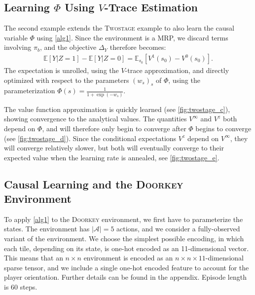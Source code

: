 \documentclass[letterpaper]{article} %
\newcommand{\EE}{\mathbb{E}}
\newcommand{\doorkey}{\textsc{Doorkey}\xspace}
\newcommand{\twostage}{\textsc{Twostage}\xspace}
\begin{document}
	
	
	
	
	
	
	
	\subsection{Learning $\Phi$ Using $V$-Trace Estimation} \label{sec33} %
	
	
	The second example extends the \twostage example to also learn the causal variable $\Phi$ using \cref{alg1}. Since the environment is a MRP, we discard terms involving $\pi_b$, and the objective $\Delta_Y$ therefore becomes: %
	\begin{align}
		\EE\left[Y|Z\!=\!1 \right]\! -\! \EE\left[Y|Z\!=\!0\right]\! =\! \EE_{s_0} \left[ V^{1}(s_0)\! -\! V^{0}(s_0) \right]. \label{eq45}
	\end{align}
	The expectation is unrolled, using the $V$-trace approximation, and directly optimized with respect to the parameters $(w_s)_s$ of $\Phi$, using the parameterization $\Phi(s) = \frac{1}{1+\exp(-w_s)}$. 
	
	
	The value function approximation is quickly learned (see \cref{fig:twostage_c}), showing convergence to the analytical values.
	The quantities $V^\infty$ and $V^{z}$ both depend on $\Phi$, and will therefore only begin to converge after $\Phi$ begins to converge (see \cref{fig:twostage_d}). Since the conditional expectations $V^z$ depend on $V^\infty$, they will converge relatively slower, but both will eventually converge to their expected value when the learning rate is annealed, see \cref{fig:twostage_e}. 
	
	
	
	
	
	
	
	
	\subsection{Causal Learning and the \doorkey Environment}
	To apply \cref{alg1} to the \doorkey environment, we first have to parameterize the states. The environment has $|\mathcal A| = 5$ actions, and we consider a fully-observed variant of the environment. We choose the simplest possible encoding, in which each tile, depending on its state, is one-hot encoded as an 11-dimensional vector. This means that an $n\times n$ environment is encoded as an $n\times n \times 11$-dimensional sparse tensor, and we include a single one-hot encoded feature to account for the player orientation. Further details can be found in the appendix. Episode length is 60 steps.
	
\end{document}
